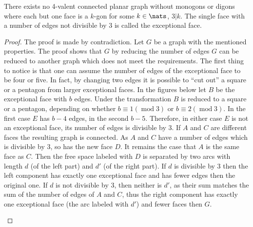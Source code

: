 \begin{lemma}
  There exists no 4-valent connected planar graph without monogons or digons where each but one face is a $k$-gon for some $k \in \nats$, $3 | k$. The single face with a number of edges not divisible by $3$ is called the exceptional face.
  \begin{proof} The proof is made by contradiction. Let $G$ be a graph with the mentioned properties. The proof shows that $G$ by reducing the number of edges $G$ can be reduced to another graph which does not meet the requirements. The first thing to notice is that one can assume the number of edges of the exceptional face to be four or five. In fact, by changing two edges it is possible to ``cut out'' a square or a pentagon from larger exceptional faces.
    In the figures below let $B$ be the exceptional face with $b$ edges. Under the transformation $B$ is reduced to a square or a pentagon, depending on whether $b \equiv 1 (\operatorname{mod} 3)$ or $b \equiv 2 (\operatorname{mod} 3)$. In the first case $E$ has $b - 4$ edges, in the second $b-5$. Therefore, in either case $E$ is not an exceptional face, its number of edges is divisible by $3$. If $A$ and $C$ are different faces the resulting graph is connected. As $A$ and $C$ have a number of edges which is divisible by $3$, so has the new face $D$. It remains the case that $A$ is the same face as $C$. Then the free space labeled with $D$ is separated by two arcs with length $d$ (of the left part) and $d'$ (of the right part). If $d$ is divisible by $3$ then the left component has exactly one exceptional face and has fewer edges then the original one. If $d$ is not divisible by $3$, then neither is $d'$, as their sum matches the sum of the number of edges of $A$ and $C$, thus the right component has exactly one exceptional face (the arc labeled with $d'$) and fewer faces then $G$.
    \begin{figure}[htpp]
      \centering
\end{figure}
\end{proof}
\end{lemma}
